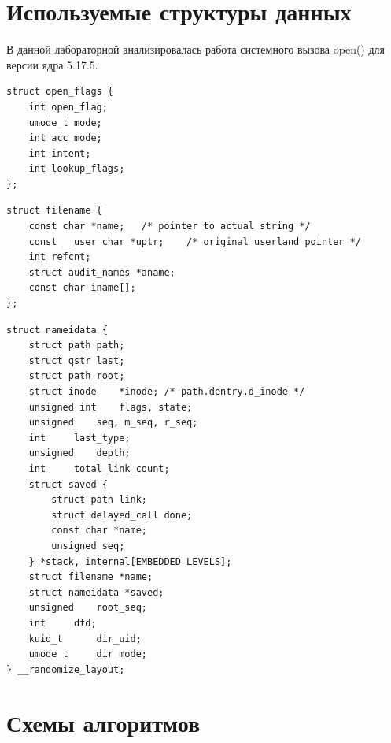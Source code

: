 \documentclass[14pt,a4paper]{scrreprt}
\begin{document}


\thispagestyle{empty}

\chapter{Используемые структуры данных}

В данной лабораторной анализировалась работа системного вызова open() для версии ядра 5.17.5.

\begin{lstlisting}[caption=Структура open\_flags]
struct open_flags {
	int open_flag;
	umode_t mode;
	int acc_mode;
	int intent;
	int lookup_flags;
};
\end{lstlisting}

\begin{lstlisting}[caption=Структура filename]
struct filename {
	const char *name;	/* pointer to actual string */
	const __user char *uptr;	/* original userland pointer */
	int refcnt;
	struct audit_names *aname;
	const char iname[];
};
\end{lstlisting}

\begin{lstlisting}[caption=Структура nameidata]
struct nameidata {
	struct path	path;
	struct qstr	last;
	struct path	root;
	struct inode	*inode; /* path.dentry.d_inode */
	unsigned int	flags, state;
	unsigned	seq, m_seq, r_seq;
	int		last_type;
	unsigned	depth;
	int		total_link_count;
	struct saved {
		struct path link;
		struct delayed_call done;
		const char *name;
		unsigned seq;
	} *stack, internal[EMBEDDED_LEVELS];
	struct filename	*name;
	struct nameidata *saved;
	unsigned	root_seq;
	int		dfd;
	kuid_t		dir_uid;
	umode_t		dir_mode;
} __randomize_layout;
\end{lstlisting}

\chapter{Схемы алгоритмов}
\end{document}
